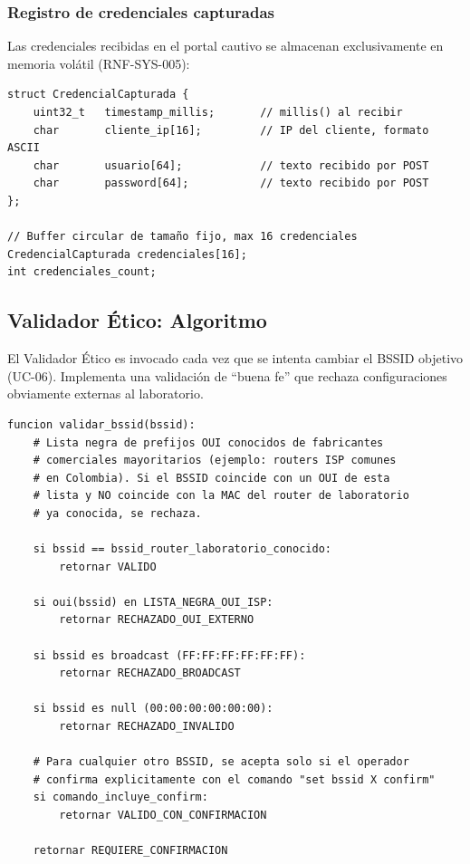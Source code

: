 \documentclass[11pt,a4paper]{article}
\begin{document}
\subsubsection{Registro de credenciales capturadas}
Las credenciales recibidas en el portal cautivo se almacenan
exclusivamente en memoria volátil (RNF-SYS-005):

\begin{lstlisting}
struct CredencialCapturada {
    uint32_t   timestamp_millis;       // millis() al recibir
    char       cliente_ip[16];         // IP del cliente, formato ASCII
    char       usuario[64];            // texto recibido por POST
    char       password[64];           // texto recibido por POST
};

// Buffer circular de tamaño fijo, max 16 credenciales
CredencialCapturada credenciales[16];
int credenciales_count;
\end{lstlisting}

\subsection{Validador Ético: Algoritmo}

El Validador Ético es invocado cada vez que se intenta cambiar el BSSID
objetivo (UC-06). Implementa una validación de ``buena fe'' que rechaza
configuraciones obviamente externas al laboratorio.

\begin{lstlisting}
funcion validar_bssid(bssid):
    # Lista negra de prefijos OUI conocidos de fabricantes
    # comerciales mayoritarios (ejemplo: routers ISP comunes
    # en Colombia). Si el BSSID coincide con un OUI de esta
    # lista y NO coincide con la MAC del router de laboratorio
    # ya conocida, se rechaza.

    si bssid == bssid_router_laboratorio_conocido:
        retornar VALIDO

    si oui(bssid) en LISTA_NEGRA_OUI_ISP:
        retornar RECHAZADO_OUI_EXTERNO

    si bssid es broadcast (FF:FF:FF:FF:FF:FF):
        retornar RECHAZADO_BROADCAST

    si bssid es null (00:00:00:00:00:00):
        retornar RECHAZADO_INVALIDO

    # Para cualquier otro BSSID, se acepta solo si el operador
    # confirma explicitamente con el comando "set bssid X confirm"
    si comando_incluye_confirm:
        retornar VALIDO_CON_CONFIRMACION

    retornar REQUIERE_CONFIRMACION
\end{lstlisting}
\end{document}
